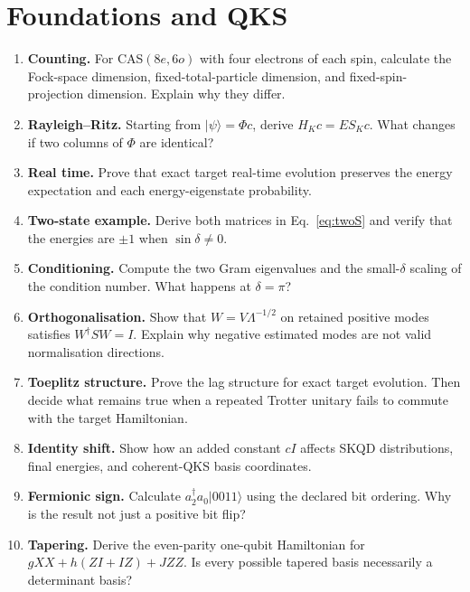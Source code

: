 \documentclass[11pt,a4paper,oneside]{report}
\newcommand{\ket}[1]{\lvert #1\rangle}
\begin{document}
\section{Foundations and QKS}
\begin{enumerate}[label=\textbf{\arabic*.},itemsep=8pt]
\item \textbf{Counting.} For CAS$(8e,6o)$ with four electrons of each spin, calculate the Fock-space dimension, fixed-total-particle dimension, and fixed-spin-projection dimension. Explain why they differ.
\item \textbf{Rayleigh--Ritz.} Starting from $\ket\psi=\Phi c$, derive $H_Kc=ES_Kc$. What changes if two columns of $\Phi$ are identical?
\item \textbf{Real time.} Prove that exact target real-time evolution preserves the energy expectation and each energy-eigenstate probability.
\item \textbf{Two-state example.} Derive both matrices in Eq.~\eqref{eq:twoS} and verify that the energies are $\pm1$ when $\sin\delta\ne0$.
\item \textbf{Conditioning.} Compute the two Gram eigenvalues and the small-$\delta$ scaling of the condition number. What happens at $\delta=\pi$?
\item \textbf{Orthogonalisation.} Show that $W=V\Lambda^{-1/2}$ on retained positive modes satisfies $W^\dagger SW=I$. Explain why negative estimated modes are not valid normalisation directions.
\item \textbf{Toeplitz structure.} Prove the lag structure for exact target evolution. Then decide what remains true when a repeated Trotter unitary fails to commute with the target Hamiltonian.
\item \textbf{Identity shift.} Show how an added constant $cI$ affects SKQD distributions, final energies, and coherent-QKS basis coordinates.
\item \textbf{Fermionic sign.} Calculate $a_2^\dagger a_0\ket{0011}$ using the declared bit ordering. Why is the result not just a positive bit flip?
\item \textbf{Tapering.} Derive the even-parity one-qubit Hamiltonian for $gXX+h(ZI+IZ)+JZZ$. Is every possible tapered basis necessarily a determinant basis?
\end{enumerate}
\end{document}
